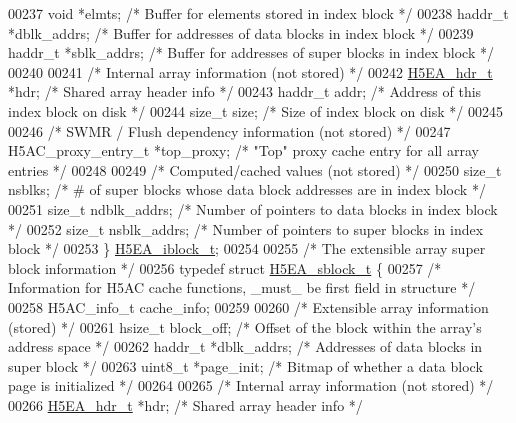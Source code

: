 \begin{DoxyCode}
00237     \textcolor{keywordtype}{void}        *elmts;         \textcolor{comment}{/* Buffer for elements stored in index block  */}
00238     haddr\_t     *dblk\_addrs;    \textcolor{comment}{/* Buffer for addresses of data blocks in index block */}
00239     haddr\_t     *sblk\_addrs;    \textcolor{comment}{/* Buffer for addresses of super blocks in index block */}
00240 
00241     \textcolor{comment}{/* Internal array information (not stored) */}
00242     \hyperlink{struct_h5_e_a__hdr__t}{H5EA\_hdr\_t}    *hdr;           \textcolor{comment}{/* Shared array header info                     */}
00243     haddr\_t     addr;           \textcolor{comment}{/* Address of this index block on disk          */}
00244     \textcolor{keywordtype}{size\_t}      size;           \textcolor{comment}{/* Size of index block on disk                  */}
00245 
00246     \textcolor{comment}{/* SWMR / Flush dependency information (not stored) */}
00247     H5AC\_proxy\_entry\_t *top\_proxy;      \textcolor{comment}{/* "Top" proxy cache entry for all array entries */}
00248 
00249     \textcolor{comment}{/* Computed/cached values (not stored) */}
00250     \textcolor{keywordtype}{size\_t}      nsblks;         \textcolor{comment}{/* # of super blocks whose data block addresses are in index block */}
00251     \textcolor{keywordtype}{size\_t}      ndblk\_addrs;    \textcolor{comment}{/* Number of pointers to data blocks in index block */}
00252     \textcolor{keywordtype}{size\_t}      nsblk\_addrs;    \textcolor{comment}{/* Number of pointers to super blocks in index block */}
00253 \} \hyperlink{struct_h5_e_a__iblock__t}{H5EA\_iblock\_t};
00254 
00255 \textcolor{comment}{/* The extensible array super block information */}
00256 \textcolor{keyword}{typedef} \textcolor{keyword}{struct }\hyperlink{struct_h5_e_a__sblock__t}{H5EA\_sblock\_t} \{
00257     \textcolor{comment}{/* Information for H5AC cache functions, \_must\_ be first field in structure */}
00258     H5AC\_info\_t cache\_info;
00259 
00260     \textcolor{comment}{/* Extensible array information (stored) */}
00261     hsize\_t     block\_off;      \textcolor{comment}{/* Offset of the block within the array's address space */}
00262     haddr\_t     *dblk\_addrs;    \textcolor{comment}{/* Addresses of data blocks in super block */}
00263     uint8\_t     *page\_init;     \textcolor{comment}{/* Bitmap of whether a data block page is initialized */}
00264 
00265     \textcolor{comment}{/* Internal array information (not stored) */}
00266     \hyperlink{struct_h5_e_a__hdr__t}{H5EA\_hdr\_t}  *hdr;           \textcolor{comment}{/* Shared array header info                     */}

\end{DoxyCode}
